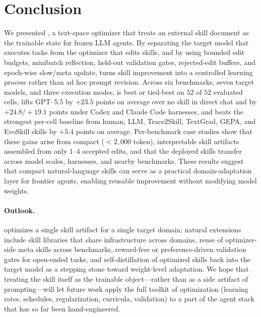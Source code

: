 \section{Conclusion}

We presented \ourmethod{}, a text-space optimizer that treats an external skill document as the trainable state for frozen LLM agents. By separating the target model that executes tasks from the optimizer that edits skills, and by using bounded edit budgets, minibatch reflection, held-out validation gates, rejected-edit buffers, and epoch-wise slow/meta update, \ourmethod{} turns skill improvement into a controlled learning process rather than ad hoc prompt revision. Across six benchmarks, seven target models, and three execution modes, \ourmethod{} is best or tied-best on $52$ of $52$ evaluated cells, lifts GPT--5.5 by $+23.5$ points on average over no skill in direct chat and by $+24.8 / +19.1$ points under Codex and Claude Code harnesses, and beats the strongest per-cell baseline from human, LLM, Trace2Skill, TextGrad, GEPA, and EvoSkill skills by $+5.4$ points on average. Per-benchmark case studies show that these gains arise from compact ($<2{,}000$ token), interpretable skill artifacts assembled from only $1$--$4$ accepted edits, and that the deployed skills transfer across model scales, harnesses, and nearby benchmarks. These results suggest that compact natural-language skills can serve as a practical domain-adaptation layer for frontier agents, enabling reusable improvement without modifying model weights.

\paragraph{Outlook.}
\ourmethod{} optimizes a single skill artifact for a single target domain; natural extensions include skill libraries that share infrastructure across domains, reuse of optimizer-side meta skills across benchmarks, reward-free or preference-driven validation gates for open-ended tasks, and self-distillation of optimized skills back into the target model as a stepping stone toward weight-level adaptation. We hope that treating the skill itself as the trainable object---rather than as a side artifact of prompting---will let future work apply the full toolkit of optimization (learning rates, schedules, regularization, curricula, validation) to a part of the agent stack that has so far been hand-engineered.
